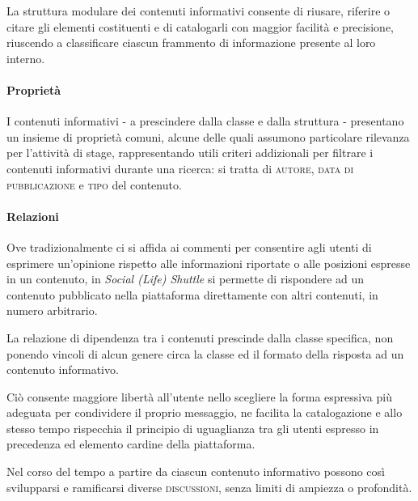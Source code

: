 La struttura modulare dei contenuti informativi consente di riusare, riferire o citare gli elementi costituenti e di catalogarli con maggior facilità e precisione, riuscendo a classificare ciascun frammento di informazione presente al loro interno.

\paragraph{Proprietà}
I contenuti informativi - a prescindere dalla classe e dalla struttura - presentano un insieme di proprietà comuni, alcune delle quali assumono particolare rilevanza per l'attività di stage, rappresentando utili criteri addizionali per filtrare i contenuti informativi durante una ricerca: si tratta di \textsc{autore}, \textsc{data di pubblicazione} e \textsc{tipo} del contenuto.

\paragraph{Relazioni}
Ove tradizionalmente ci si affida ai commenti per consentire agli utenti di esprimere un'opinione rispetto alle informazioni riportate o alle posizioni espresse in un contenuto, in \textit{Social (Life) Shuttle} si permette di rispondere ad un contenuto pubblicato nella piattaforma direttamente con altri contenuti, in numero arbitrario.

La relazione di dipendenza tra i contenuti prescinde dalla classe specifica, non ponendo vincoli di alcun genere circa la classe ed il formato della risposta ad un contenuto informativo.

Ciò consente maggiore libertà all'utente nello scegliere la forma espressiva più adeguata per condividere il proprio messaggio, ne facilita la catalogazione e allo stesso tempo rispecchia il principio di uguaglianza tra gli utenti espresso in precedenza ed elemento cardine della piattaforma.

Nel corso del tempo a partire da ciascun contenuto informativo possono così svilupparsi e ramificarsi diverse \textsc{discussioni}, senza limiti di ampiezza o profondità.

